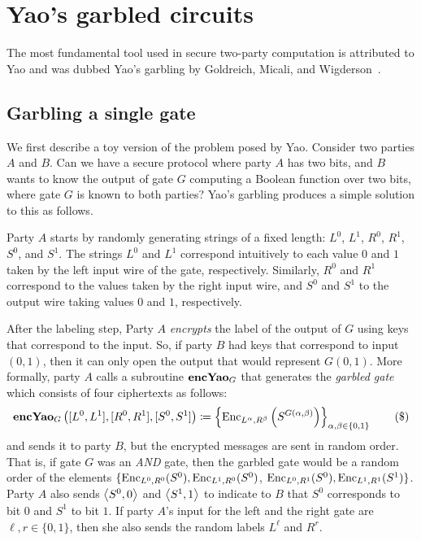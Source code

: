 \section{Yao's garbled circuits}\label{sec:yao}

The most fundamental tool used in secure two-party computation is attributed to Yao and was dubbed Yao's garbling by Goldreich, Micali, and Wigderson~\cite{GMW87}. 

\subsection{Garbling a single gate}

We first describe a toy version of the problem posed by Yao. Consider two parties $A$ and $B$. Can we have a secure protocol where party $A$ has two bits, and $B$ wants to know the output of gate $G$ computing a Boolean function over two bits, where gate $G$ is known to both parties? Yao's garbling produces a simple solution to this as follows.

Party $A$ starts by randomly generating strings of a fixed length: $L^0$, $L^1$, $R^0$, $R^1$, $S^0$, and $S^1$. The strings $L^0$ and $L^1$ correspond intuitively to each value $0$ and $1$ taken by the left input wire of the gate, respectively. Similarly, $R^0$ and $R^1$ correspond to the values taken by the right input wire, and $S^0$ and $S^1$ to the output wire taking values $0$ and $1$, respectively.

After the labeling step, Party $A$ \emph{encrypts} the label of the output of $G$ using keys that correspond to the input. So, if party $B$ had keys that correspond to input $(0,1)$, then it can only open the output that would represent $G(0,1)$.
More formally, party $A$ calls 
a subroutine $\textbf{\text{encYao}}_G$ that generates the \emph{garbled gate} which consists of four ciphertexts as follows:
\begin{equation}
  \textbf{\text{encYao}}_G  \left( [L^0, L^1], [R^0, R^1], [S^0, S^1] \right)
  \coloneqq
    \left\{ \text{Enc}_{L^\alpha,R^\beta}  \left(
        S^{G(\alpha,\beta)} \right) \right\}_{\alpha,\beta \in \{0,1\}} \tag{\$}\label{eq:yao}
\end{equation}
and sends it to party $B$, but the encrypted messages are sent in random order. 
That is, if gate $G$ was an \emph{AND} gate, then the garbled gate would be a random order of the elements $\{\text{Enc}_{L^0,R^0}(S^0),\text{Enc}_{L^1,R^0}(S^0)$, $\text{Enc}_{L^0,R^1}(S^0),\text{Enc}_{L^1,R^1}(S^1)\}$. Party $A$ also sends $\left\langle S^0,0 \right\rangle$ and $\left\langle S^1, 1 \right\rangle$ to indicate to $B$ that $S^0$ corresponds to bit $0$ and $S^1$ to bit $1$. If party $A$'s input for the left and the right gate are $\ell,r\in \{0,1\}$, then she also sends the random labels $L^\ell$ and $R^r$.

